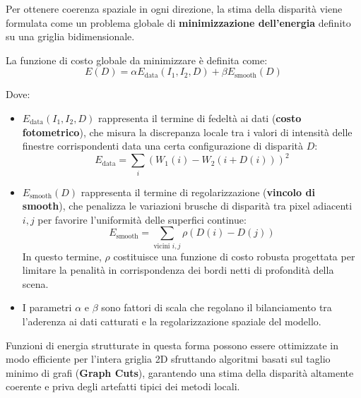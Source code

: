 ﻿\documentclass[11pt, a4paper]{article}
\begin{document}
Per ottenere coerenza spaziale in ogni direzione, la stima della disparità viene formulata come un problema globale di \textbf{minimizzazione dell'energia} definito su una griglia bidimensionale.


La funzione di costo globale da minimizzare è definita come:
\[ \boxed{E(D) = \alpha E_{\text{data}}(I_1, I_2, D) + \beta E_{\text{smooth}}(D)} \]

Dove:
\begin{itemize}
    \item $E_{\text{data}}(I_1, I_2, D)$ rappresenta il termine di fedeltà ai dati (\textbf{costo fotometrico}), che misura la discrepanza locale tra i valori di intensità delle finestre corrispondenti data una certa configurazione di disparità $D$:
    \[ E_{\text{data}} = \sum_{i} \left( W_1(i) - W_2(i + D(i)) \right)^2 \]

    \item $E_{\text{smooth}}(D)$ rappresenta il termine di regolarizzazione (\textbf{vincolo di smooth}), che penalizza le variazioni brusche di disparità tra pixel adiacenti $i, j$ per favorire l'uniformità delle superfici continue:
    \[ E_{\text{smooth}} = \sum_{\text{vicini } i, j} \rho(D(i) - D(j)) \]
    In questo termine, $\rho$ costituisce una funzione di costo robusta progettata per limitare la penalità in corrispondenza dei bordi netti di profondità della scena.

    \item I parametri $\alpha$ e $\beta$ sono fattori di scala che regolano il bilanciamento tra l'aderenza ai dati catturati e la regolarizzazione spaziale del modello.
\end{itemize}

Funzioni di energia strutturate in questa forma possono essere ottimizzate in modo efficiente per l'intera griglia 2D sfruttando algoritmi basati sul taglio minimo di grafi (\textbf{Graph Cuts}), garantendo una stima della disparità altamente coerente e priva degli artefatti tipici dei metodi locali.
\end{document}

